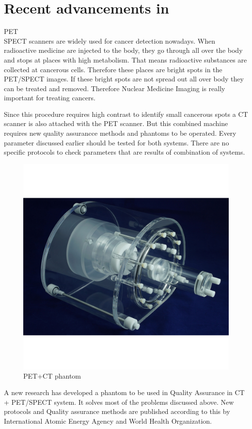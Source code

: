 \documentclass[12pt]{article}
\makeatletter
\let\thetitle\@title
\makeatother
\begin{document}
\pagebreak
\section{Recent advancements in \thetitle}
PET\\SPECT scanners are widely used for cancer detection nowadays. When radioactive medicine are injected to the body, they go through all over the body and stops at places with high metabolism. That means radioactive substances are collected at cancerous cells. Therefore these places are bright spots in the PET/SPECT images. If these bright spots are not spread out all over  body they can be treated and removed. Therefore Nuclear Medicine Imaging is really important for treating cancers. 

Since this procedure requires high contrast to identify small cancerous spots a CT scanner is also attached with the PET scanner. But this combined machine requires new quality assurancce methods and phantoms to be operated. Every parameter discussed earlier should be tested for both systems. There are no specific protocols to check parameters that are results of combination of systems. 
\begin{figure}[h!]
    \centering
    \includegraphics[width=0.65\linewidth]{ct.jpg}
    \caption{\small{PET+CT phantom}}
    \label{fig:PET+CT phantom}
\end{figure}
A new research has developed a phantom to be used in Quality Assurance in CT + PET/SPECT system. It solves most of the problems discussed above. New protocols and Quality assurance methods are published according to this by International Atomic Energy Agency and World Health Organization. 


\end{document}

